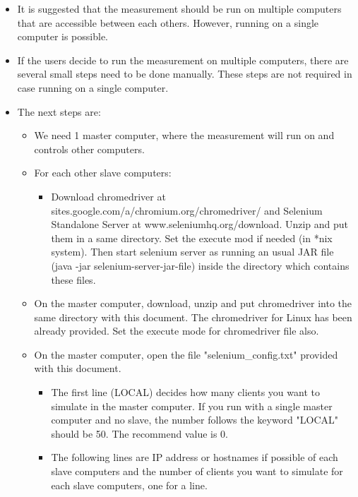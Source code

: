 \documentclass[10pt]{article}
\begin{document}
\begin{itemize}
\item It is suggested that the measurement should be run on multiple computers that are accessible between each others. However, running on a single computer is possible.

\item If the users decide to run the measurement on multiple computers, there are several small steps need to be done manually. These steps are not required in case running on a single computer.

\item The next steps are:

\begin{itemize}
\item We need 1 master computer, where the measurement will run on and controls other computers.
\item For each other slave computers:

\begin{itemize}
\item Download chromedriver at sites.google.com/a/chromium.org/chromedriver/ and Selenium Standalone Server at www.seleniumhq.org/download. Unzip and put them in a same directory. Set the execute mod if needed (in *nix system). Then start selenium server as running an usual JAR file (java -jar selenium-server-jar-file) inside the directory which contains these files.
\end{itemize}

\item On the master computer, download, unzip and put chromedriver into the same directory with this document. The chromedriver for Linux has been already provided. Set the execute mode for chromedriver file also.

\item On the master computer, open the file "selenium\_config.txt" provided with this document.

\begin{itemize}
\item The first line (LOCAL) decides how many clients you want to simulate in the master computer. If you run with a single master computer and no slave, the number follows the keyword "LOCAL" should be 50. The recommend value is 0.

\item The following lines are IP address or hostnames if possible of each slave computers and the number of clients you want to simulate for each slave computers, one for a line.


\end{itemize}
\end{itemize}
\end{itemize}
\end{document}
